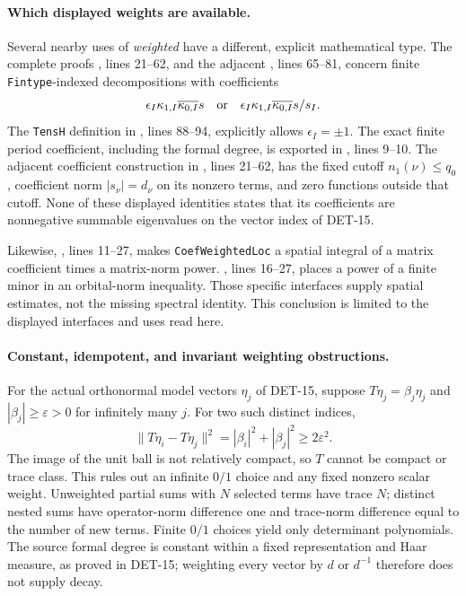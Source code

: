 \documentclass[11pt,a4paper]{article}
\newcommand{\fid}[1]{\textsf{#1}}
\begin{document}
\paragraph{Which displayed weights are available.}
Several nearby uses of \emph{weighted} have a different, explicit
mathematical type.  The complete proofs
,
lines 21--62, and the adjacent
, lines 65--81, concern finite
\texttt{Fintype}-indexed decompositions with coefficients
\[
 \epsilon_I\kappa_{1,I}\overline{\kappa_{0,I}}s
 \quad\hbox{or}\quad
 \epsilon_I\kappa_{1,I}\overline{\kappa_{0,I}}s/s_I.
\]
The \texttt{TensH} definition in
,
lines 88--94, explicitly allows \(\epsilon_I=\pm1\).
The exact finite period coefficient, including the formal degree,
is exported in
,
lines 9--10.  The adjacent coefficient construction in
,
lines 21--62, has the fixed cutoff \(n_1(\nu)\le q_0\), coefficient
norm \(|s_\nu|=d_\nu\) on its nonzero terms, and zero functions
outside that cutoff.  None of these displayed identities states
that its coefficients are nonnegative summable eigenvalues on
the vector index of \fid{DET-15}.

Likewise,
,
lines 11--27, makes \texttt{CoefWeightedLoc} a spatial integral
of a matrix coefficient times a matrix-norm power.
,
lines 16--27, places a power of a finite minor in an orbital-norm
inequality.  Those specific interfaces supply spatial estimates,
not the missing spectral identity.  This conclusion is limited
to the displayed interfaces and uses read here.

\paragraph{Constant, idempotent, and invariant weighting obstructions.}
For the actual orthonormal model vectors \(\eta_j\) of
\fid{DET-15}, suppose \(T\eta_j=\beta_j\eta_j\) and
\(|\beta_j|\ge\varepsilon>0\) for infinitely many \(j\).
For two such distinct indices,
\[
 \|T\eta_i-T\eta_j\|^2=|\beta_i|^2+|\beta_j|^2
 \ge2\varepsilon^2.
\]
The image of the unit ball is not relatively compact, so \(T\)
cannot be compact or trace class.  This rules out an infinite
\(0/1\) choice and any fixed nonzero scalar weight.
Unweighted partial sums with \(N\) selected terms have trace \(N\);
distinct nested sums have operator-norm difference one and
trace-norm difference equal to the number of new terms.
Finite \(0/1\) choices yield only determinant polynomials.
The source formal degree is constant within a fixed representation
and Haar measure, as proved in \fid{DET-15}; weighting every
vector by \(d\) or \(d^{-1}\) therefore does not supply decay.
\end{document}
